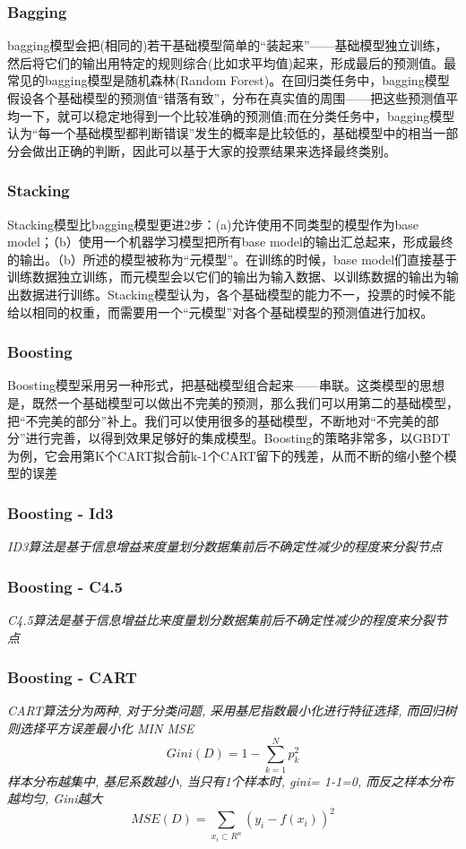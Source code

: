 \documentclass{scrartcl}
\numberwithin{equation}{section}   %
\begin{document}
\subsubsection{Bagging}
bagging模型会把(相同的)若干基础模型简单的“装起来”——基础模型独立训练，然后将它们的输出用特定的规则综合(比如求平均值)起来，形成最后的预测值。最常见的bagging模型是随机森林(Random Forest)。在回归类任务中，bagging模型假设各个基础模型的预测值“错落有致”，分布在真实值的周围——把这些预测值平均一下，就可以稳定地得到一个比较准确的预测值;而在分类任务中，bagging模型认为“每一个基础模型都判断错误”发生的概率是比较低的，基础模型中的相当一部分会做出正确的判断，因此可以基于大家的投票结果来选择最终类别。
\subsubsection{Stacking}
Stacking模型比bagging模型更进2步：(a)允许使用不同类型的模型作为base model；（b）使用一个机器学习模型把所有base model的输出汇总起来，形成最终的输出。（b）所述的模型被称为“元模型”。在训练的时候，base model们直接基于训练数据独立训练，而元模型会以它们的输出为输入数据、以训练数据的输出为输出数据进行训练。Stacking模型认为，各个基础模型的能力不一，投票的时候不能给以相同的权重，而需要用一个“元模型”对各个基础模型的预测值进行加权。
\subsubsection{Boosting}
Boosting模型采用另一种形式，把基础模型组合起来——串联。这类模型的思想是，既然一个基础模型可以做出不完美的预测，那么我们可以用第二的基础模型，把“不完美的部分”补上。我们可以使用很多的基础模型，不断地对“不完美的部分”进行完善，以得到效果足够好的集成模型。Boosting的策略非常多，以GBDT为例，它会用第K个CART拟合前k-1个CART留下的残差，从而不断的缩小整个模型的误差
\subsubsection{Boosting - Id3}
\textsl{ID3算法是基于信息增益来度量划分数据集前后不确定性减少的程度来分裂节点}

\subsubsection{Boosting - C4.5}
\textsl{C4.5算法是基于信息增益比来度量划分数据集前后不确定性减少的程度来分裂节点}
\subsubsection{Boosting - CART}
\textsl{CART算法分为两种, 对于分类问题, 采用基尼指数最小化进行特征选择, 而回归树则选择平方误差最小化 MIN MSE $$Gini(D) = 1- \sum_{k=1}^N p_k^2$$ 样本分布越集中, 基尼系数越小, 当只有1个样本时, gini= 1-1=0, 而反之样本分布越均匀, Gini越大$$MSE(D) =  \sum_{x_i \subset R^n} (y_i - f(x_i))^2$$}
\end{document}
